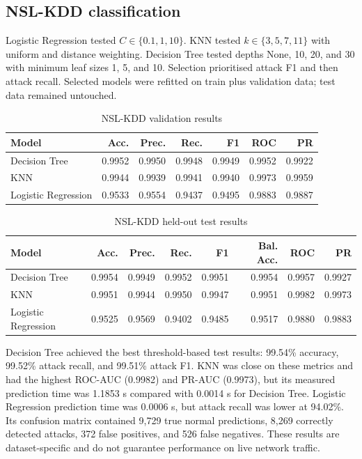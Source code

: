 \documentclass[conference]{IEEEtran}
\begin{document}
\subsection{NSL-KDD classification}
Logistic Regression tested $C \in \{0.1,1,10\}$. KNN tested $k \in \{3,5,7,11\}$ with uniform and distance weighting. Decision Tree tested depths None, 10, 20, and 30 with minimum leaf sizes 1, 5, and 10. Selection prioritised attack F1 and then attack recall. Selected models were refitted on train plus validation data; test data remained untouched.
\begin{table}[t]
\caption{NSL-KDD validation results}
\centering\scriptsize
\begin{tabular}{lrrrrrr}
\toprule Model & Acc. & Prec. & Rec. & F1 & ROC & PR\\\midrule
Decision Tree & 0.9952 & 0.9950 & 0.9948 & 0.9949 & 0.9952 & 0.9922\\
KNN & 0.9944 & 0.9939 & 0.9941 & 0.9940 & 0.9973 & 0.9959\\
Logistic Regression & 0.9533 & 0.9554 & 0.9437 & 0.9495 & 0.9883 & 0.9887\\
\bottomrule
\end{tabular}
\end{table}
\begin{table}[t]
\caption{NSL-KDD held-out test results}
\centering\scriptsize
\begin{tabular}{lrrrrrrr}
\toprule Model & Acc. & Prec. & Rec. & F1 & Bal. Acc. & ROC & PR\\\midrule
Decision Tree & 0.9954 & 0.9949 & 0.9952 & 0.9951 & 0.9954 & 0.9957 & 0.9927\\
KNN & 0.9951 & 0.9944 & 0.9950 & 0.9947 & 0.9951 & 0.9982 & 0.9973\\
Logistic Regression & 0.9525 & 0.9569 & 0.9402 & 0.9485 & 0.9517 & 0.9880 & 0.9883\\
\bottomrule
\end{tabular}
\end{table}
Decision Tree achieved the best threshold-based test results: 99.54\% accuracy, 99.52\% attack recall, and 99.51\% attack F1. KNN was close on these metrics and had the highest ROC-AUC (0.9982) and PR-AUC (0.9973), but its measured prediction time was 1.1853 s compared with 0.0014 s for Decision Tree. Logistic Regression prediction time was 0.0006 s, but attack recall was lower at 94.02\%. Its confusion matrix contained 9,729 true normal predictions, 8,269 correctly detected attacks, 372 false positives, and 526 false negatives. These results are dataset-specific and do not guarantee performance on live network traffic.
\end{document}
